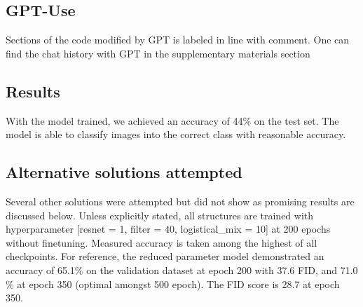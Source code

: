 \documentclass{article}
\begin{document}
\subsection{GPT-Use}
Sections of the code modified by GPT is labeled in line with comment. One can find the chat history with GPT in the supplementary materials section

\subsection{Results}
With the model trained, we achieved an accuracy of 44\% on the test set. The model is able to classify images into the correct class with reasonable accuracy.

\subsection{Alternative solutions attempted}
\label{alternative_solution}

Several other solutions were attempted but did not show as promising results are discussed below. Unless explicitly stated, all structures are trained with hyperparameter [resnet = 1, filter = 40, logistical\_mix = 10] at 200 epochs without finetuning. Measured accuracy is taken among the highest of all checkpoints. For reference, the reduced parameter model demonstrated an accuracy of 65.1\% on the validation dataset at epoch 200 with 37.6 FID, and 71.0 \% at epoch 350 (optimal amongst 500 epoch). The FID score is 28.7 at epoch 350.
\end{document}

